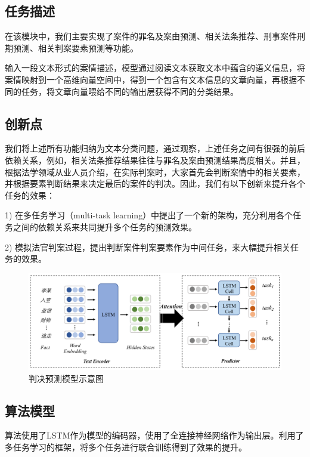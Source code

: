 \subsection{任务描述}
在该模块中，我们主要实现了案件的罪名及案由预测、相关法条推荐、刑事案件刑期预测、相关判案要素预测等功能。

输入一段文本形式的案情描述，模型通过阅读文本获取文本中蕴含的语义信息，将案情映射到一个高维向量空间中，得到一个包含有文本信息的文章向量，再根据不同的任务，将文章向量喂给不同的输出层获得不同的分类结果。

\subsection{创新点}
我们将上述所有功能归纳为文本分类问题，通过观察，上述任务之间有很强的前后依赖关系，例如，相关法条推荐结果往往与罪名及案由预测结果高度相关。并且，根据法学领域从业人员介绍，在实际判案时，大家首先会判断案情中的相关要素，并根据要素判断结果来决定最后的案件的判决。因此，我们有以下创新来提升各个任务的效果：

1)	在多任务学习（multi-task learning）中提出了一个新的架构，充分利用各个任务之间的依赖关系来共同提升多个任务的预测效果。

2)	模拟法官判案过程，提出判断案件判案要素作为中间任务，来大幅提升相关任务的效果。

\begin{figure}[ht]
    \centering
    \includegraphics[width=\linewidth]{figures/model1}
    \caption{判决预测模型示意图}
    \label{fig:model1}
\end{figure}

\subsection{算法模型}
算法使用了LSTM作为模型的编码器，使用了全连接神经网络作为输出层。利用了多任务学习的框架，将多个任务进行联合训练得到了效果的提升。

